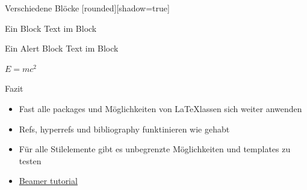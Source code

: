 \documentclass{beamer}
\begin{document}
\begin{frame}{Verschiedene Blöcke}
    [rounded][shadow=true]
    \begin{block}{Ein Block}
        Text im Block
    \end{block}
    \begin{alertblock}{Ein Alert Block}
        Text im Block
    \end{alertblock}
    \begin{definition}
        $E = mc^2$
    \end{definition}
\end{frame}

\begin{frame}{Fazit}
    \begin{itemize}
        \item Fast alle packages und Möglichkeiten von \LaTeX lassen sich weiter anwenden
        \item Refs, hyperrefs und bibliography funktinieren wie gehabt
        \item Für alle Stilelemente gibt es unbegrenzte Möglichkeiten und templates zu testen
        \item \href{https://www.overleaf.com/learn/latex/Beamer}{Beamer tutorial}
    \end{itemize}
\end{frame}
\end{document}
